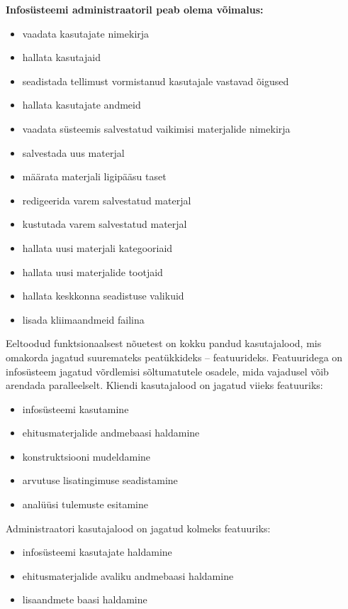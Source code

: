 \textbf{Infosüsteemi administraatoril peab olema võimalus:}
\begin{itemize}

    \item vaadata kasutajate nimekirja
    \item hallata kasutajaid
    \item seadistada tellimust vormistanud kasutajale vastavad õigused
    \item hallata kasutajate andmeid
    \item vaadata süsteemis salvestatud vaikimisi materjalide nimekirja
    \item salvestada uus materjal
    \item määrata materjali ligipääsu taset
    \item redigeerida varem salvestatud materjal
    \item kustutada varem salvestatud materjal
    \item hallata uusi materjali kategooriaid
    \item hallata uusi materjalide tootjaid
    \item hallata keskkonna seadistuse valikuid
    \item lisada kliimaandmeid failina
\end{itemize}

Eeltoodud funktsionaalsest nõuetest on kokku pandud kasutajalood, mis omakorda jagatud suuremateks peatükkideks -- featuurideks. Featuuridega on infosüsteem jagatud võrdlemisi sõltumatutele
osadele, mida vajadusel võib arendada paralleelselt. 
Kliendi kasutajalood on jagatud viieks featuuriks:
\begin{itemize}
    \item infosüsteemi kasutamine
    \item ehitusmaterjalide andmebaasi haldamine
    \item konstruktsiooni mudeldamine
    \item arvutuse lisatingimuse seadistamine 
    \item analüüsi tulemuste esitamine
\end{itemize}
Administraatori kasutajalood on jagatud kolmeks featuuriks:
\begin{itemize}
    \item infosüsteemi kasutajate haldamine
    \item ehitusmaterjalide avaliku andmebaasi haldamine
    \item lisaandmete baasi haldamine
\end{itemize}


